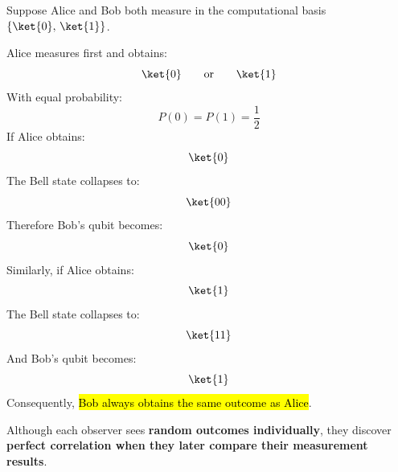 \begin{examplebox}
    Suppose Alice and Bob both measure in the computational basis $\{\ket{0}, \, \ket{1}\}$.

    \highspace
    Alice measures first and obtains:
    \begin{equation*}
        \ket{0}
        \qquad\text{or}\qquad
        \ket{1}
    \end{equation*}
    With equal probability:
    \begin{equation*}
        P(0)=P(1)=\frac{1}{2}
    \end{equation*}
    If Alice obtains:
    \begin{equation*}
        \ket{0}
    \end{equation*}
    The Bell state collapses to:
    \begin{equation*}
        \ket{00}
    \end{equation*}
    Therefore Bob's qubit becomes:
    \begin{equation*}
        \ket{0}
    \end{equation*}
    Similarly, if Alice obtains:
    \begin{equation*}
        \ket{1}
    \end{equation*}
    The Bell state collapses to:
    \begin{equation*}
        \ket{11}
    \end{equation*}
    And Bob's qubit becomes:
    \begin{equation*}
        \ket{1}
    \end{equation*}
    Consequently, \hl{Bob always obtains the same outcome as Alice}.

    \highspace
    Although each observer sees \textbf{random outcomes individually}, they discover \textbf{perfect correlation when they later compare their measurement results}.
\end{examplebox}

